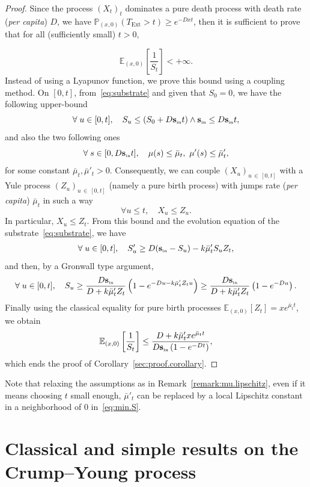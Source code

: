 \documentclass[10pt]{amsart}
\theoremstyle{definition}\newtheorem{defi}[theo]{Definition}\newtheorem{rema}[theo]{Remark}\newtheorem{exam}[theo]{Example}\newtheorem{exem}[theo]{Example}\newtheorem{nota}[theo]{Notation}
\newcommand{\PP}{\mathbb{P}}
\newcommand{\EE}{\mathbb{E}}
\newcommand{\Sin}{{\mathbf s}_{\textrm{\tiny\rm in}}}
\newcommand{\Text}{T_{\mathrm{Ext}}}
\newcommand{\1}{\mathbf{1}}
\let\oldforall\forall
\renewcommand*{\forall}{\mathrel{\oldforall}}
\begin{document}
\begin{proof}
Since the process $(X_t)_t$ dominates a pure death process with death rate (\emph{per capita}) $D$, we have $\PP_{(x,0)}(\Text > t) \geq e^{-D x t}$, then it is sufficient to prove that for all (sufficiently small) $t>0$,

\[
\EE_{(x,0)}\left[\frac{1}{S_t} \right] <+\infty.
\]
Instead of using a Lyapunov function, we prove this bound using a coupling method. On $[0,t]$, from~\eqref{eq:substrate} and given that $S_0=0$, we have the following upper-bound
\[
\forall u\in [0,t], \quad S_u \leq (S_0 + D\Sin t)\wedge \Sin \leq D\Sin t,
\]
and also the two following ones
\[
\forall s\in[0,D\Sin t], \quad \mu(s) \leq \bar\mu_t, \ \mu'(s) \leq \bar\mu'_t,
\]
for some constant $\bar\mu_t, \bar\mu'_t>0$. Consequently, we can couple $(X_u)_{u\,\in\,[0,t]}$ with a Yule process $(Z_u)_{u\,\in \,[0,t]}$ (namely a pure birth process) with jumps rate (\emph{per capita}) $\bar\mu_t$ in such a way
\[
\forall u\leq t, \quad X_u \leq Z_u.
\]
In particular, $X_u\leq Z_t$. From this bound and the evolution equation of the substrate~\eqref{eq:substrate}, we have
\begin{align}\label{eq:min.S}
\forall u\in [0,t], \quad S_u' \geq D(\Sin -S_u) - k \bar\mu'_t S_u Z_t,
\end{align}
and then, by a Gronwall type argument,
\[
\forall u\in [0,t], \quad S_u \geq \frac{D \Sin}{D+ k \bar\mu'_t Z_t } \left(1-e^{-D u- k \bar\mu'_t Z_t u}\right) \geq \frac{D \Sin}{D+ k \bar\mu'_tZ_t } \left(1-e^{-D u}\right).
\]
Finally using the classical equality for pure birth processes $\EE_{(x,0)}[Z_t] = x e^{\bar\mu_t t}$, we obtain
\[
\EE_{(x,0)}\left[\frac{1}{S_t} \right] \leq \frac{D+ k \bar\mu'_t x e^{\bar\mu_t t} }{D \Sin \left(1-e^{-D t}\right)},
\]
which ends the proof of Corollary~\ref{sec:proof.corollary}.
\end{proof}

Note that relaxing the assumptions as in Remark~\ref{remark:mu.lipschitz}, even if it means choosing $t$ small enough, $\bar{\mu}'_t$ can be replaced by a local Lipschitz constant in a neighborhood of $0$ in~\eqref{eq:min.S}.



\appendix



\section{Classical and simple results on the Crump--Young process}
\end{document}
